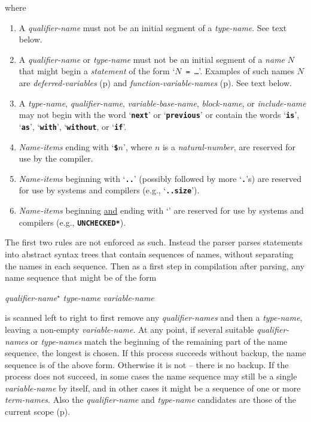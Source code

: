 \documentclass[12pt]{article}
\newcommand{\TT}[1]{{\tt \bfseries #1}}
\newcommand{\pagref}[1]{p\pageref{#1}}
\newcommand{\STAR}{{\Large $^\star$}}
\newcommand{\TMP}{\$}			%
\newenvironment{indpar}[1][0.3in]%
	{\begin{list}{}%
		     {\setlength{\itemsep}{0in}%
		      \setlength{\topsep}{0in}%
		      \setlength{\parsep}{1ex}%
		      \setlength{\labelwidth}{#1}%
		      \setlength{\leftmargin}{#1}%
		      \addtolength{\leftmargin}{\labelsep}}%
	 \item}%
	{\end{list}}
\begin{document}
\begin{indpar}
where
\begin{enumerate}
\item
A {\em qualifier-name} must not be an initial segment
of a {\em type-name}.  See text below.
\item
A {\em qualifier-name} or {\em type-name} must not be an initial segment
of a {\em name} $N$ that might begin a {\em statement} of
the form `{\tt $N$ = \ldots}'.  Examples of such names $N$
are {\em deferred-variables} (\pagref{DEFERRED-VARIABLE})
and {\em function-variable-names} (\pagref{FUNCTION-VARIABLE-NAME}).
See text below.
\label{TYPE-NAME-RULE}
\item
A {\em type-name}, {\em qualifier-name}, {\em variable-base-name},
{\em block-name}, or {\em include-name}
may not begin with the word `\TT{next}' or `\TT{previous}' or
contain the words `\TT{is}', `\TT{as}', `\TT{with}', `\TT{without},
or `\TT{if}'.
\item
{\em Name-items} ending with `\TT{\TMP$n$}',
where $n$ is a {\em natural-number}, are
reserved for use by the compiler.
\item
{\em Name-items} beginning with `\TT{..}' (possibly followed by more
`\TT{.}'s) are reserved
for use by systems and compilers (e.g., `\TT{..size}').
\item
{\em Name-items} beginning \underline{and} ending
with `\TT{*}' are reserved
for use by systems and compilers (e.g., \TT{*UNCHECKED*}).
\end{enumerate}
\end{indpar}

The first two rules are not enforced as such.  Instead the parser
parses statements into abstract syntax trees that contain
sequences of names, without separating the names in each sequence.
Then as a first step in compilation after parsing,
any name sequence that might be of the form
\begin{center}
{\em qualifier-name}\STAR{} {\em type-name} {\em variable-name}
\end{center}
is scanned left to right to first remove any {\em qualifier-names}
and then a {\em type-name}, leaving a non-empty {\em variable-name}.
At any point, if several suitable {\em qualifier-names} or
{\em type-names} match the
beginning of the remaining part of the name sequence, the longest
is chosen.  If this process succeeds without backup, the name
sequence is of the above form.  Otherwise it is not -- there is
no backup.  If the process does not succeed, in some
cases the name sequence may still be a single {\em variable-name}
by itself, and in other cases it might be a sequence of one or
more {\em term-names}.
Also the {\em qualifier-name} and {\em type-name}
candidates are those of the current scope (\pagref{SCOPE}).
\end{document}
